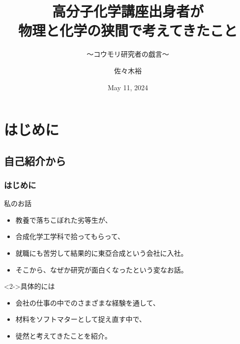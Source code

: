 \documentclass[unicode,12pt]{beamer}%
\title
{高分子化学講座出身者が\\物理と化学の狭間で考えてきたこと}
\subtitle{～コウモリ研究者の戯言～}
\author[佐々木]{佐々木裕}
\institute[21期]{21期 （元 東亞合成株式会社）}
\date{May 11, 2024}
\begin{document}
\begin{frame}\frametitle{}
	\titlepage
\end{frame}
\section{はじめに}
\subsection{自己紹介から}
\begin{frame}
    \frametitle{はじめに}
    \begin{block}{私のお話}
        \begin{itemize}
            \item 教養で落ちこぼれた劣等生が、 
            \item 合成化学工学科で拾ってもらって、
            \item 就職にも苦労して結果的に東亞合成という会社に入社。
            \item そこから、なぜか研究が面白くなったという変なお話。
        \end{itemize}
    \end{block}
    \begin{exampleblock}<2->{具体的には}
        \begin{itemize}
            \item 会社の仕事の中でのさまざまな経験を通して、
            \item 材料をソフトマターとして捉え直す中で、
            \item 徒然と考えてきたことを紹介。
        \end{itemize}
    \end{exampleblock}
    \vspace{1mm}
\end{frame}
\end{document}
